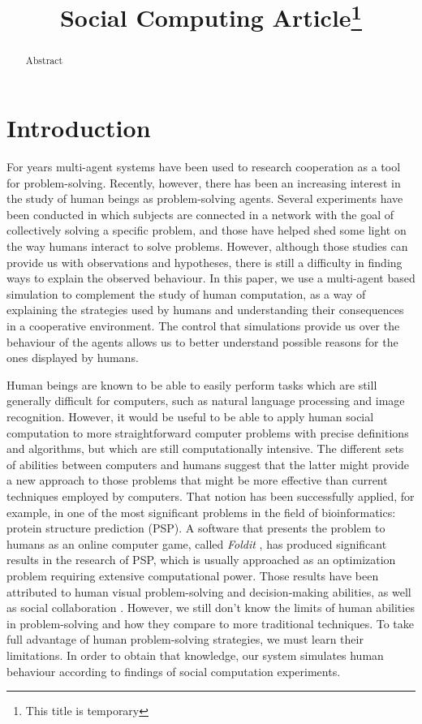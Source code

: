 \documentclass[letterpaper]{article}
\title{Social Computing Article\thanks{This title is temporary}}
\begin{document}
\maketitle

\begin{abstract}
  Abstract
\end{abstract}

\section{Introduction}

For years multi-agent systems have been used to research cooperation as a tool for problem-solving. Recently, however, there has been an increasing interest in the study of human beings as problem-solving agents. Several experiments have been conducted in which subjects are connected in a network with the goal of collectively solving a specific problem, and those have helped shed some light on the way humans interact to solve problems. However, although those studies can provide us with observations and hypotheses, there is still a difficulty in finding ways to explain the observed behaviour. In this paper, we use a multi-agent based simulation to complement the study of human computation, as a way of explaining the strategies used by humans and understanding their consequences in a cooperative environment. The control that simulations provide us over the behaviour of the agents allows us to better understand possible reasons for the ones displayed by humans.

Human beings are known to be able to easily perform tasks which are still generally difficult for computers, such as natural language processing and image recognition. However, it would be useful to be able to apply human social computation to more straightforward computer problems with precise definitions and algorithms, but which are still computationally intensive. The different sets of abilities between computers and humans suggest that the latter might provide a new approach to those problems that might be more effective than current techniques employed by computers. That notion has been successfully applied, for example, in one of the most significant problems in the field of bioinformatics: protein structure prediction (PSP). A software that presents the problem to humans as an online computer game, called \emph{Foldit} \cite{cooper:foldit}, has produced significant results in the research of PSP, which is usually approached as an optimization problem requiring extensive computational power. Those results have been attributed to human visual problem-solving and decision-making abilities, as well as social collaboration \cite{cooper:foldit}. However, we still don't know the limits of human abilities in problem-solving and how they compare to more traditional techniques. To take full advantage of human problem-solving strategies, we must learn their limitations. In order to obtain that knowledge, our system simulates human behaviour according to findings of social computation experiments.
\end{document}
